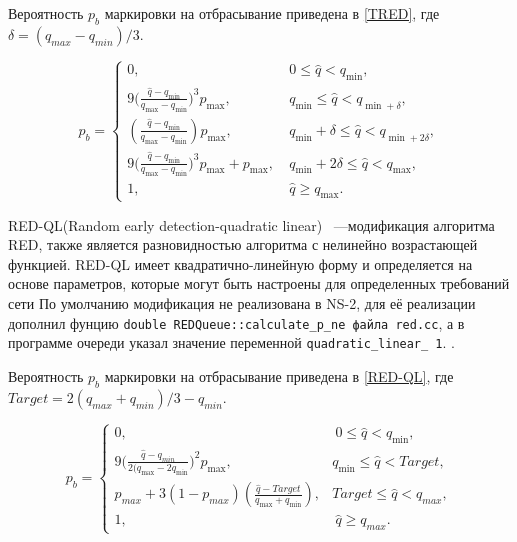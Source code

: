 Вероятность $p_{b}$ маркировки на отбрасывание приведена в \eqref{TRED}, где $ \delta = (q_{max} - q_{min})/3 $.

\begin{equation}
\label{TRED}
p_{b} = \begin{cases}
        0, &  \ 0 \leqslant \hat{q} < q_{\min},
        \\
        9({\frac{\hat{q} - q_{\min}}{q_{\max} - q_{\min}})^3} {p_{\max}}, & \ q_{\min} \leqslant  \hat{q} < q_{\min + \delta},
        \\
        (\frac{\hat{q} - q_{\min}}{q_{\max} - q_{\min}}) {p_{\max}}, & \ q_{\min} + \delta \leqslant \hat{q} < q_{\min + 2\delta},
        \\
        9({\frac{\hat{q} - q_{\min}}{q_{\max} - q_{\min}})^3} {p_{\max}} + {p_{\max}}, & \ q_{\min} +2\delta \leqslant  \hat{q} < q_{\max},
        \\
        1, &  \ \hat{q} \geqslant q_{\max}.
\end{cases}
\end{equation} 


RED-QL(Random early detection-quadratic linear) ~---модификация алгоритма RED, также является разновидностью алгоритма с нелинейно возрастающей функцией. RED-QL имеет квадратично-линейную форму и определяется на основе параметров, которые могут быть настроены для определенных требований сети\cite{REDQL} По умолчанию модификация не реализована в NS-2, для её реализации дополнил фунцию \verb|double REDQueue::calculate_p_ne файла red.cc|, а в программе очереди указал значение переменной \verb|quadratic_linear_ 1|. . 

Вероятность $p_{b}$ маркировки на отбрасывание приведена в \eqref{RED-QL}, где $ Target = 2(q_{max} + q_{min})/3 - q_{min} $.

\begin{equation}
\label{RED-QL}
p_{b} = \begin{cases}
        0, &  \ 0 \leqslant \hat{q} < q_{\min},
        \\
        9({\frac{\hat{q} - q_{min}}{2(q_{\max} - 2q_{\min}})^2} {p_{\max}}, &  q_{\min} \leqslant  \hat{q} < {Target},
        \\
        p_{max} + 3(1-p_{max}) (\frac{\hat{q} - Target}{q_{\max} + q_{\min}}), & {Target} \leqslant  \hat{q} < q_{max},
        \\
        1, &  \ \hat{q} \geqslant q_{max}.
\end{cases}
\end{equation}

